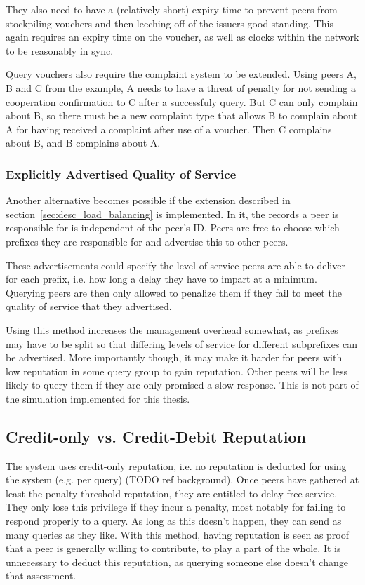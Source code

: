 They also need to have a (relatively short) expiry time to prevent peers from
stockpiling vouchers and then leeching off of the issuers good standing. This
again requires an expiry time on the voucher, as well as clocks within the
network to be reasonably in sync.

Query vouchers also require the complaint system to be extended. Using peers A,
B and C from the example, A needs to have a threat of penalty for not sending a
cooperation confirmation to C after a successfuly query. But C can only complain
about B, so there must be a new complaint type that allows B to complain about A
for having received a complaint after use of a voucher. Then C complains about
B, and B complains about A.

\subsubsection{Explicitly Advertised Quality of Service}
Another alternative becomes possible if the extension described in
section~\ref{sec:desc_load_balancing} is implemented. In it, the records a peer
is responsible for is independent of the peer's ID. Peers are free to choose
which prefixes they are responsible for and advertise this to other peers.

These advertisements could specify the level of service peers are able to
deliver for each prefix, i.e. how long a delay they have to impart at a minimum.
Querying peers are then only allowed to penalize them if they fail to meet the
quality of service that they advertised.

Using this method increases the management overhead somewhat, as prefixes may
have to be split so that differing levels of service for different subprefixes
can be advertised. More importantly though, it may make it harder for peers with
low reputation in some query group to gain reputation. Other peers will be less
likely to query them if they are only promised a slow response. This is not part
of the simulation implemented for this thesis.

\subsection{Credit-only vs. Credit-Debit Reputation}
\label{sec:desc_credit_only_vs_credit_debit}
The system uses credit-only reputation, i.e. no reputation is deducted for using
the system (e.g. per query) (TODO ref background). Once peers have gathered at
least the penalty threshold reputation, they are entitled to delay-free service.
They only lose this privilege if they incur a penalty, most notably for failing
to respond properly to a query. As long as this doesn't happen, they can send as
many queries as they like.  With this method, having reputation is seen as proof
that a peer is generally willing to contribute, to play a part of the whole. It
is unnecessary to deduct this reputation, as querying someone else doesn't
change that assessment.

